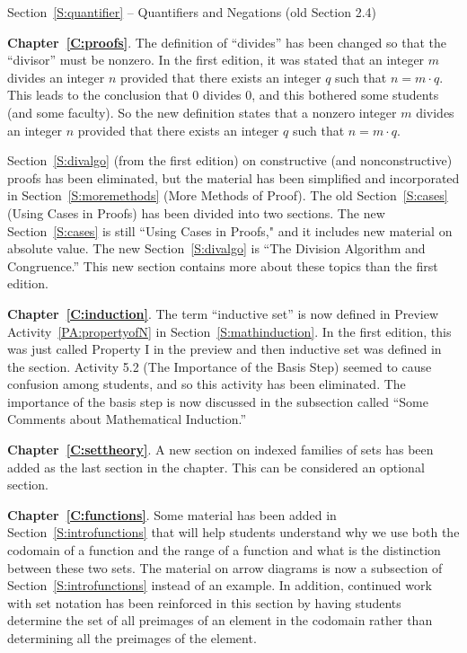 Section~\ref{S:quantifier} -- Quantifiers and Negations (old Section 2.4)



\vskip6pt
\noindent
\textbf{Chapter~\ref{C:proofs}}.  The definition of ``divides'' has been changed so that the ``divisor'' must be nonzero.  In the first edition, it was stated that an integer $m$ divides an integer $n$ provided that there exists an integer $q$ such that $n = m \cdot q$.  This leads to the conclusion that $0$ divides $0$, and this bothered some students (and some faculty).  So the new definition states that a nonzero integer $m$ divides an integer $n$ provided that there exists an integer $q$ such that $n = m \cdot q$.

Section~\ref{S:divalgo} (from the first edition) on constructive (and nonconstructive) proofs has been eliminated, but the material has been simplified and incorporated in Section~\ref{S:moremethods} (More Methods of Proof).  The old Section~\ref{S:cases} (Using Cases in Proofs) has been divided into two sections.  The new Section~\ref{S:cases} is still ``Using Cases in Proofs," and it includes new material on absolute value.  The new Section~\ref{S:divalgo} is ``The Division Algorithm and Congruence.''  This new section contains more about these topics than the first edition.


\vskip6pt
\noindent
\textbf{Chapter~\ref{C:induction}}.  The term ``inductive set'' is now defined in Preview Activity~\ref{PA:propertyofN} in Section~\ref{S:mathinduction}.  In the first edition, this was just called Property I in the preview and then inductive set was defined in the section.  Activity 5.2 (The Importance of the Basis Step) seemed to cause confusion among students, and so this activity has been eliminated.  The importance of the basis step is now discussed in the subsection called ``Some Comments about Mathematical Induction.''

\noindent
\textbf{Chapter~\ref{C:settheory}}.  A new section on indexed families of sets has been added as the last section in the chapter.  This can be considered an optional section.


\vskip6pt
\noindent
\textbf{Chapter~\ref{C:functions}}. Some material has been added in 
Section~\ref{S:introfunctions} that will help students understand why we use both the codomain of a function and the range of a function and what is the distinction between these two sets.  The material on arrow diagrams is now a subsection of 
Section~\ref{S:introfunctions} instead of an example.  In addition, continued work with set notation has been reinforced in this section by having students determine the set of all preimages of an element in the codomain rather than determining all the preimages of the element.


